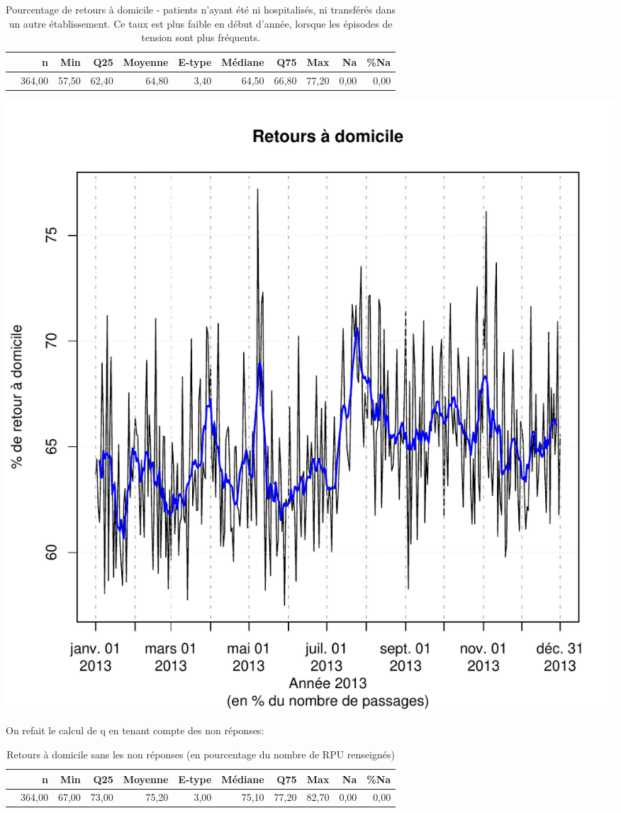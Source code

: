 \documentclass[12pt,english,french,twoside]{book}\usepackage[]{graphicx}\usepackage[]{color}
\makeatletter
\def\maxwidth{ %
  \ifdim\Gin@nat@width>\linewidth
    \linewidth
  \else
    \Gin@nat@width
  \fi
}
\makeatother
\begin{document}
\begin{table}[ht]
\centering
\begin{tabular}{rrrrrrrrrrr}
  \hline
 & n & Min & Q25 & Moyenne & E-type & Médiane & Q75 & Max & Na & \%Na \\ 
  \hline
 & 364,00 & 57,50 & 62,40 & 64,80 & 3,40 & 64,50 & 66,80 & 77,20 & 0,00 & 0,00 \\ 
   \hline
\end{tabular}
\caption[Retour à domicile]{Pourcentage de retours à domicile - patients n'ayant été ni hospitalisés, ni transférés dans un autre établissement. Ce taux est plus faible en début d'année, lorsque les épisodes de tension sont plus fréquents.} 
\label{tab:rd}
\end{table}

\includegraphics[width=\maxwidth]{figure/retour_dom-1} 


On refait le calcul de q en tenant compte des non réponses:
\begin{table}[ht]
\centering
\begin{tabular}{rrrrrrrrrrr}
  \hline
 & n & Min & Q25 & Moyenne & E-type & Médiane & Q75 & Max & Na & \%Na \\ 
  \hline
 & 364,00 & 67,00 & 73,00 & 75,20 & 3,00 & 75,10 & 77,20 & 82,70 & 0,00 & 0,00 \\ 
   \hline
\end{tabular}
\caption[Retours à domicile sans les non réponses]{Retours à domicile sans les non réponses (en pourcentage du nombre de RPU renseignés)} 
\label{tab:rdsansNA}
\end{table}
\end{document}
